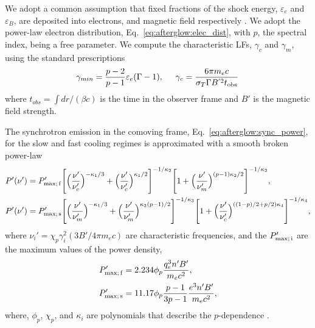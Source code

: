We adopt a common assumption that fixed fractions of the shock  
energy, $\varepsilon_e$ and $\varepsilon_B$, are deposited into electrons, 
and magnetic field respectively \citep[\eg][]{Dermer:1997pv}. 
%
We adopt the power-law electron distribution, Eq.~\eqref{eq:afterglow:elec_dist}, 
with $p$, the spectral index, being a free parameter.
%
We compute the characteristic \acp{LF}, $\gamma_c$ and $\gamma_m$, using the standard
prescriptions \citep[\eg][]{Dermer:2008ev}
%
\begin{equation}
\label{eq:afterglow:gmin_gc}
\gamma_{min} = \frac{p - 2}{p - 1}  \varepsilon_e (\Gamma - 1) , \hspace{5mm} \gamma_c = \frac{6 \pi m_e c }{\sigma_T \Gamma B^{'2} t_{\rm obs}}\, 
\end{equation}
%
where $t_{obs} = \int dr / (\beta c)$ is the time in the 
observer frame and $B'$ is the magnetic field strength.

%
The synchrotron emission in the comoving frame, 
Eq.~\eqref{eq:afterglow:sync_power}, for the slow and fast cooling 
regimes is approximated with a smooth broken power-law 
\citep{Johannesson:2006zs}
%
\begin{equation}
\begin{aligned}
P'(\nu') &= P_{\rm max;\, f}' \Bigg[\Big(\frac{\nu'}{\nu_c'}\Big)^{-\kappa_1/3} + \Big(\frac{\nu'}{\nu_c '}\Big)^{\kappa_1/2}\Bigg]^{-1/\kappa_2} \Bigg[1 + \Big(\frac{\nu'}{\nu_m '}\Big)^{(p-1)\kappa_2/2}\Bigg]^{-1/\kappa_2}, \\
P'(\nu') &= P_{\rm max;\, s}' \Bigg[\Big(\frac{\nu'}{\nu_m'}\Big)^{-\kappa_1/3} + \Big(\frac{\nu'}{\nu_m '}\Big)^{\kappa_3(p-1)/2}\Bigg]^{-1/\kappa_3} \Bigg[1 + \Big(\frac{\nu'}{\nu_c '}\Big)^{((1-p)/2 + p/2)\kappa_4}\Bigg]^{-1/\kappa_4},
\end{aligned}
\end{equation}
%
where $\nu_i ' = \chi_p \gamma_i^2 (3 B' / 4 \pi m_e c)$ 
are characteristic frequencies, and the 
$P_{\rm max;\, i}'$ are the maximum values of the power density, 
%
\begin{align}
P' _{\rm max;\, f} &= 2.234 \phi_p \frac{q_e^3 n' B'}{m_e c^2}, \\
P' _{\rm max;\, s} &= 11.17 \phi_p \frac{p-1}{3p-1}\frac{e^3 n' B'}{m_e c^2},
\end{align}
%
where, $\phi_p$, $\chi_p$, and $\kappa_i$ are polynomials that 
describe the $p$-dependence \citep{Johannesson:2006zs}.


